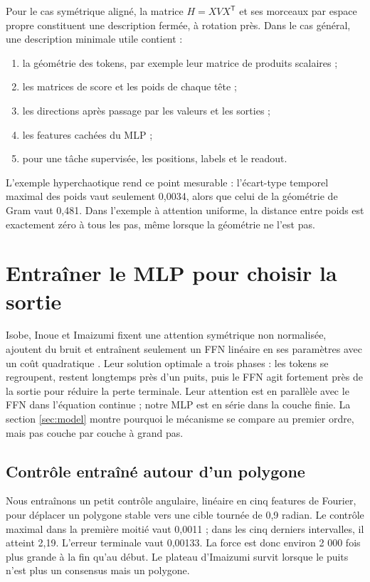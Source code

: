 \documentclass[11pt,a4paper]{article}
\theoremstyle{definition}
\newcommand{\T}{\mathsf T}
\begin{document}
Pour le cas symétrique aligné, la matrice $H=XVX^{\T}$ et ses morceaux par espace
propre constituent une description fermée, à rotation près. Dans le cas général, une
description minimale utile contient :

\begin{enumerate}
  \item la géométrie des tokens, par exemple leur matrice de produits scalaires ;
  \item les matrices de score et les poids de chaque tête ;
  \item les directions après passage par les valeurs et les sorties ;
  \item les features cachées du MLP ;
  \item pour une tâche supervisée, les positions, labels et le readout.
\end{enumerate}

L'exemple hyperchaotique rend ce point mesurable : l'écart-type temporel maximal des
poids vaut seulement 0,0034, alors que celui de la géométrie de Gram vaut 0,481. Dans
l'exemple à attention uniforme, la distance entre poids est exactement zéro à tous les
pas, même lorsque la géométrie ne l'est pas.

\section{Entraîner le MLP pour choisir la sortie}
\label{sec:training}

Isobe, Inoue et Imaizumi fixent une attention symétrique non normalisée, ajoutent du
bruit et entraînent seulement un FFN linéaire en ses paramètres avec un coût
quadratique \cite{isobe2026training}. Leur solution optimale a trois phases : les
tokens se regroupent, restent longtemps près d'un puits, puis le FFN agit fortement
près de la sortie pour réduire la perte terminale. Leur attention est en parallèle
avec le FFN dans l'équation continue ; notre MLP est en série dans la couche finie.
La section \ref{sec:model} montre pourquoi le mécanisme se compare au premier ordre,
mais pas couche par couche à grand pas.

\subsection{Contrôle entraîné autour d'un polygone}

Nous entraînons un petit contrôle angulaire, linéaire en cinq features de Fourier, pour
déplacer un polygone stable vers une cible tournée de 0,9 radian. Le contrôle maximal
dans la première moitié vaut 0,0011 ; dans les cinq derniers intervalles, il atteint
2,19. L'erreur terminale vaut 0,00133. La force est donc environ 2 000 fois plus grande
à la fin qu'au début. Le plateau d'Imaizumi survit lorsque le puits n'est plus un
consensus mais un polygone.
\end{document}

